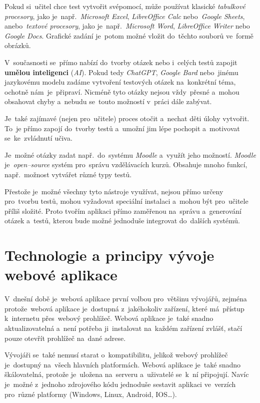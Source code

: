 \documentclass[11pt,a4paper]{report}
\begin{document}
            Pokud si~učitel chce test vytvořit svépomocí, může používat klasické \emph{tabulkové procesory}, jako je~např.~\emph{Microsoft Excel}, \emph{LibreOffice Calc} nebo~\emph{Google Sheets}, anebo~\emph{textové procesory}, jako je~např.~\emph{Microsoft Word}, \emph{LibreOffice Writer} nebo \emph{Google Docs}. Grafické zadání je~potom možné vložit do~těchto souborů ve~formě obrázků.

            V~současnosti se~přímo nabízí do~tvorby otázek nebo i~celých testů zapojit \textbf{umělou inteligenci} (\emph{AI}). Pokud tedy \emph{ChatGPT}, \emph{Google Bard} nebo~jinému jazykovému modelu zadáme vytvoření testových otázek na~konkrétní téma, ochotně nám~je~připraví. Nicméně tyto otázky nejsou vždy~přesné a~mohou obsahovat chyby a~nebudu se~touto možností v~práci dále zabývat.

            Je~také zajímavé (nejen pro~učitele) proces otočit a~nechat děti úlohy vytvořit. To~je přímo zapojí do~tvorby testů a~umožní jim lépe pochopit a~motivovat se~ke~zvládnutí učiva. \cite{hedlovam:chybavresenim}

            Je~možné otázky zadat např.~do~systému \emph{Moodle} a~využít jeho možností. \emph{Moodle} je~\emph{open--source} systém pro~správu vzdělávacích kurzů. Obsahuje mnoho funkcí, např.~možnost vytvářet různé typy testů. \cite{drlik2013moodle}

            Přestože je~možné všechny tyto nástroje využívat, nejsou přímo určeny pro~tvorbu testů, mohou vyžadovat speciální instalaci a~mohou být pro~učitele příliš složité. Proto tvořím aplikaci přímo zaměřenou na~správu a~generování otázek a~testů, kterou bude možné jednoduše integrovat do~dalších systémů.

    \chapter{Technologie a principy vývoje webové aplikace}
        V~dnešní době je~webová aplikace první volbou pro~většinu vývojářů, zejména protože~webová aplikace je~dostupná z~jakéhokoliv zařízení, které má~přístup k~internetu přes~webový prohlížeč. Webová aplikace je~také snadno aktualizovatelná a~není potřeba ji~instalovat na~každém zařízení zvlášť, stačí pouze otevřít prohlížeč na~dané adrese.
        
        Vývojáři se~také nemusí starat o~kompatibilitu, jelikož webový prohlížeč je~dostupný na~všech hlavních platformách. Webová aplikace je~také snadno škálovatelná, protože je~uložena na~serveru a~uživatelé se~k~ní připojují. Navíc je~možné z~jednoho zdrojového kódu jednoduše sestavit aplikaci ve~verzích pro~různé platformy (Windows, Linux, Android, IOS\dots).~\cite{adobe:webapp}
\end{document}
